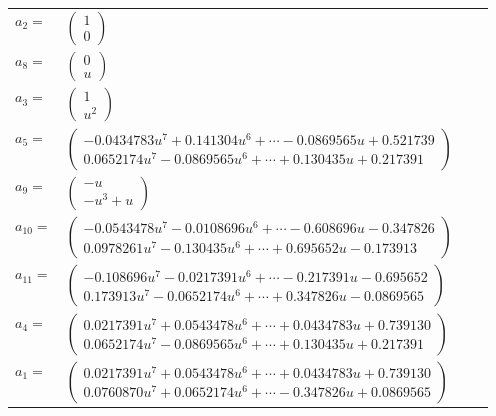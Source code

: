 \documentclass[1p]{elsarticle_modified}
\theoremstyle{definition}
\begin{document}
\begin{tabular}{m{7pt} m{180pt} m{7pt} m{180pt} }
\flushright $a_{2}=$&$\begin{pmatrix}1\\0\end{pmatrix}$ \\
\flushright $a_{8}=$&$\begin{pmatrix}0\\u\end{pmatrix}$ \\
\flushright $a_{3}=$&$\begin{pmatrix}1\\u^2\end{pmatrix}$ \\
\flushright $a_{5}=$&$\begin{pmatrix}-0.0434783 u^{7}+0.141304 u^{6}+\cdots-0.0869565 u+0.521739\\0.0652174 u^{7}-0.0869565 u^{6}+\cdots+0.130435 u+0.217391\end{pmatrix}$ \\
\flushright $a_{9}=$&$\begin{pmatrix}- u\\- u^3+u\end{pmatrix}$ \\
\flushright $a_{10}=$&$\begin{pmatrix}-0.0543478 u^{7}-0.0108696 u^{6}+\cdots-0.608696 u-0.347826\\0.0978261 u^{7}-0.130435 u^{6}+\cdots+0.695652 u-0.173913\end{pmatrix}$ \\
\flushright $a_{11}=$&$\begin{pmatrix}-0.108696 u^{7}-0.0217391 u^{6}+\cdots-0.217391 u-0.695652\\0.173913 u^{7}-0.0652174 u^{6}+\cdots+0.347826 u-0.0869565\end{pmatrix}$ \\
\flushright $a_{4}=$&$\begin{pmatrix}0.0217391 u^{7}+0.0543478 u^{6}+\cdots+0.0434783 u+0.739130\\0.0652174 u^{7}-0.0869565 u^{6}+\cdots+0.130435 u+0.217391\end{pmatrix}$ \\
\flushright $a_{1}=$&$\begin{pmatrix}0.0217391 u^{7}+0.0543478 u^{6}+\cdots+0.0434783 u+0.739130\\0.0760870 u^{7}+0.0652174 u^{6}+\cdots-0.347826 u+0.0869565\end{pmatrix}$ \\

\end{tabular}
\end{document}
